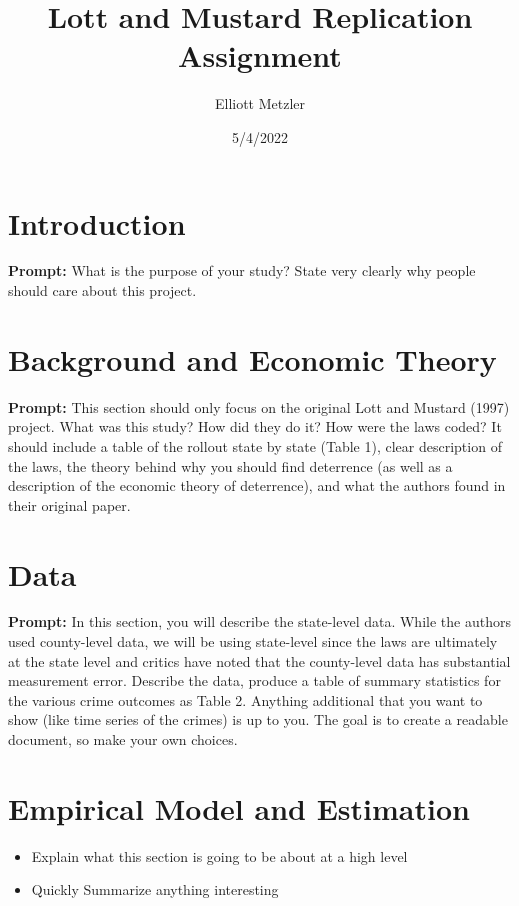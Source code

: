 \documentclass{article}
\author{Elliott Metzler}
\title{Lott and Mustard Replication Assignment}
\date{5/4/2022}
\begin{document}
\maketitle

\section{Introduction}

\textbf{Prompt:}  What is the purpose of your study?  State very clearly why people should care about this project.  

\section{Background and Economic Theory}

\textbf{Prompt:} This section should only focus on the original Lott and Mustard (1997) project.  What was this study?  How did they do it?  How were the laws coded?  It should include a table of the rollout state by state (Table 1), clear description of the laws, the theory behind why you should find deterrence (as well as a description of the economic theory of deterrence), and what the authors found in their original paper.  



\section{Data}

\textbf{Prompt:} In this section, you will describe the state-level data.  While the authors used county-level data, we will be using state-level since the laws are ultimately at the state level and critics have noted that the county-level data has substantial measurement error.  Describe the data, produce a table of summary statistics for the various crime outcomes as Table 2. Anything additional that you want to show (like time series of the crimes) is up to you. The goal is to create a readable document, so make your own choices.






\section{Empirical Model and Estimation}

\begin{itemize}
\item 
Explain what this section is going to be about at a high level
\item
Quickly Summarize anything interesting

\end{itemize}
\end{document}
